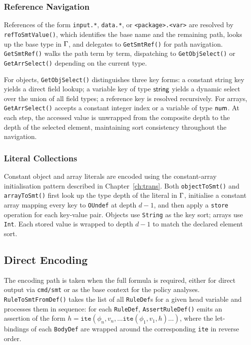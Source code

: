 \subsubsection{Reference Navigation}

References of the form \texttt{input.*}, \texttt{data.*}, or \texttt{<package>.<var>}
are resolved by \texttt{refToSmtValue()}, which identifies the base name and the
remaining path, looks up the base type in $\Gamma$, and delegates to
\texttt{GetSmtRef()} for path navigation.
\texttt{GetSmtRef()} walks the path term by term, dispatching to
\texttt{GetObjSelect()} or \texttt{GetArrSelect()} depending on the current type.

For objects, \texttt{GetObjSelect()} distinguishes three key forms: a constant string
key yields a direct field lookup; a variable key of type $\mathsf{string}$ yields a dynamic select
over the union of all field types; a reference key is resolved recursively.
For arrays, \texttt{GetArrSelect()} accepts a constant integer index or a variable of
type $\mathsf{num}$.
At each step, the accessed value is unwrapped from the composite depth to the depth of
the selected element, maintaining sort consistency throughout the navigation.

\subsubsection{Literal Collections}

Constant object and array literals are encoded using the constant-array initialisation
pattern described in Chapter~\ref{ch:trans}.
Both \texttt{objectToSmt()} and \texttt{arrayToSmt()} first look up the type depth of
the literal in $\Gamma$, initialise a constant array mapping every key to \texttt{OUndef}
at depth $d{-}1$, and then apply a \texttt{store} operation for each key-value pair.
Objects use \texttt{String} as the key sort; arrays use \texttt{Int}.
Each stored value is wrapped to depth $d{-}1$ to match the declared element sort.

\subsection{Direct Encoding}
\label{ss:ir:enc}

The encoding path is taken when the full \smtlib{} formula is required, either for
direct output via \texttt{cmd/smt} or as the base context for the policy analyses.
\texttt{RuleToSmtFromDef()} takes the list of all \texttt{RuleDef}s for a given head
variable and processes them in sequence: for each \texttt{RuleDef}, \texttt{AssertRuleDef()}
emits an \smtlib{} assertion of the form $h = \texttt{ite}(\phi_n, v_n, \ldots
\texttt{ite}(\phi_1, v_1, h)\ldots)$, where the let-bindings of each \texttt{BodyDef}
are wrapped around the corresponding \texttt{ite} in reverse order.

